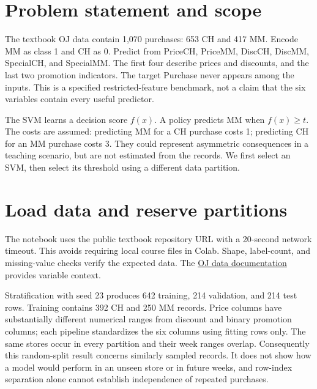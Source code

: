 

\section*{Problem statement and scope}
The textbook OJ data contain 1,070 purchases: 653 CH and 417 MM. Encode MM as class 1 and CH as 0.
Predict from PriceCH, PriceMM, DiscCH, DiscMM, SpecialCH, and SpecialMM. The first four describe prices and discounts,
and the last two promotion indicators. The target Purchase never appears among the inputs.
This is a specified restricted-feature benchmark, not a claim that the six variables contain every useful predictor.

The SVM learns a decision score $f(x)$. A policy predicts MM when $f(x)\ge t$.
The costs are assumed: predicting MM for a CH purchase costs 1; predicting CH for an MM purchase costs 3.
They could represent asymmetric consequences in a teaching scenario, but are not estimated from the records.
We first select an SVM, then select its threshold using a different data partition.

\section{Load data and reserve partitions}
The notebook uses the public textbook repository URL with a 20-second network timeout.
This avoids requiring local course files in Colab. Shape, label-count, and missing-value checks verify the expected data.
The \href{https://intro-stat-learning.github.io/ISLP/datasets/OJ.html}{OJ data documentation} provides variable context.

Stratification with seed 23 produces 642 training, 214 validation, and 214 test rows.
Training contains 392 CH and 250 MM records. Price columns have substantially different numerical ranges
from discount and binary promotion columns; each pipeline standardizes the six columns using fitting rows only.
The same stores occur in every partition and their week ranges overlap.
Consequently this random-split result concerns similarly sampled records. It does not show how a model would
perform in an unseen store or in future weeks, and row-index separation alone cannot establish independence of repeated purchases.

